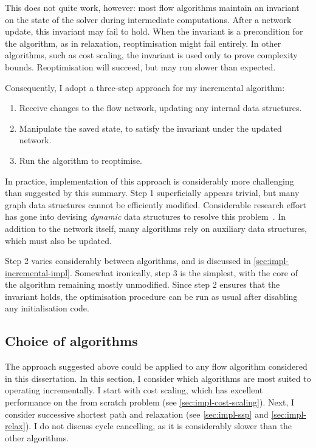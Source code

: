 This does not quite work, however: most flow algorithms maintain an invariant on the state of the solver during intermediate computations. After a network update, this invariant may fail to hold. When the invariant is a precondition for the algorithm, as in relaxation, reoptimisation might fail entirely. In other algorithms, such as cost scaling, the invariant is used only to prove complexity bounds. Reoptimisation will succeed, but may run slower than expected.

Consequently, I adopt a three-step approach for my incremental algorithm:

\begin{enumerate}
    \item Receive changes to the flow network, updating any internal data structures.
    \item Manipulate the saved state, to satisfy the invariant under the updated network.
    \item Run the algorithm to reoptimise.
\end{enumerate}

In practice, implementation of this approach is considerably more challenging than suggested by this summary. Step 1 superficially appears trivial, but many graph data structures cannot be efficiently modified. Considerable research effort has gone into devising \emph{dynamic} data structures to resolve this problem~\cite{Tarjan:1983,Eppstein:1996}. In addition to the network itself, many algorithms rely on auxiliary data structures\footnotemark, which must also be updated.

Step 2 varies considerably between algorithms, and is discussed in \cref{sec:impl-incremental-impl}. Somewhat ironically, step 3 is the simplest, with the core of the algorithm remaining mostly unmodified. Since step 2 ensures that the invariant holds, the optimisation procedure can be run as usual after disabling any initialisation code.

\subsection{Choice of algorithms} \label{sec:impl-incremental-choice}
The approach suggested above could be applied to any flow algorithm considered in this dissertation. In this section, I consider which algorithms are most suited to operating incrementally. I start with cost scaling, which has excellent performance on the from scratch problem (see \cref{sec:impl-cost-scaling}). Next, I consider successive shortest path and relaxation (see \cref{sec:impl-ssp} and \cref{sec:impl-relax}). I do not discuss cycle cancelling, as it is considerably slower than the other algorithms.


